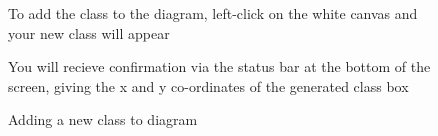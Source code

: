 \documentclass[a4paper]{article}
\begin{document}
{\begin{figure}[H]
To add the class to the diagram, left-click on the white canvas and your new class will appear

\begin{center}
 \end{center}

You will recieve confirmation via the status bar at the bottom of the screen, giving the x and y co-ordinates of the generated class box
\caption{Adding a new class to diagram}
\vspace{-10pt}
\end{figure}
\newpage
}
\end{document}
